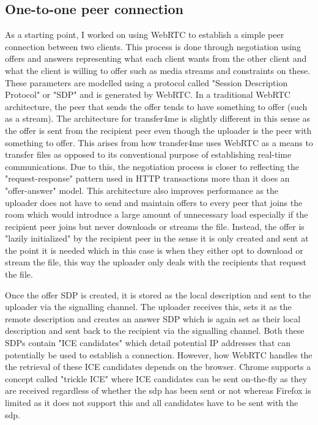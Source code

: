 \documentclass[]{report}
\begin{document}
			\subsection{One-to-one peer connection}
			As a starting point, I worked on using WebRTC to establish a simple peer connection between two clients. This process is done through negotiation using offers and answers representing what each client wants from the other client and what the client is willing to offer such as media streams and constraints on these. These parameters are modelled using a protocol called "Session Description Protocol" or "SDP" and is generated by WebRTC. In a traditional WebRTC architecture, the peer that sends the offer tends to have something to offer (such as a stream). The architecture for transfer4me is slightly different in this sense as the offer is sent from the recipient peer even though the uploader is the peer with something to offer. This arises from how transfer4me uses WebRTC as a means to transfer files as opposed to its conventional purpose of establishing real-time communications. Due to this, the negotiation process is closer to reflecting the "request-response" pattern used in HTTP transactions more than it does an "offer-answer" model. This architecture also improves performance as the uploader does not have to send and maintain offers to every peer that joins the room which would introduce a large amount of unnecessary load especially if the recipient peer joins but never downloads or streams the file. Instead, the offer is "lazily initialized" by the recipient peer in the sense it is only created and sent at the point it is needed which in this case is when they either opt to download or stream the file, this way the uploader only deals with the recipients that request the file. 
			
			Once the offer SDP is created, it is stored as the local description and sent to the uploader via the signalling channel. The uploader receives this, sets it as the remote description and creates an answer SDP which is again set as their local description and sent back to the recipient via the signalling channel. Both these SDPs contain "ICE candidates" which detail potential IP addresses that can potentially be used to establish a connection. However, how WebRTC handles the the retrieval of these ICE candidates depends on the browser. Chrome supports a concept called "trickle ICE" where ICE candidates can be sent on-the-fly as they are received regardless of whether the sdp has been sent or not whereas Firefox is limited as it does not support this and all candidates have to be sent with the sdp. 
			
\end{document}
